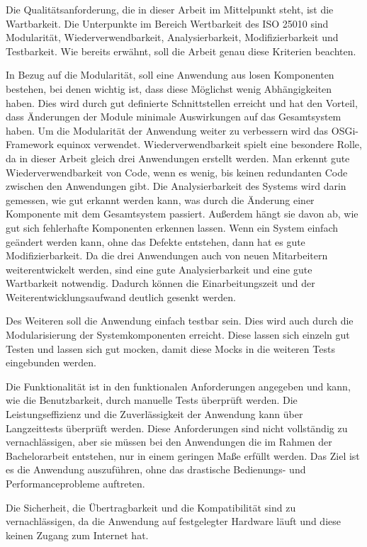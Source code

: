 Die Qualitätsanforderung, die in dieser Arbeit im Mittelpunkt steht, ist die Wartbarkeit. Die Unterpunkte im Bereich Wertbarkeit des ISO 25010 sind Modularität, Wiederverwendbarkeit, Analysierbarkeit, Modifizierbarkeit und Testbarkeit. Wie bereits erwähnt, soll die Arbeit genau diese Kriterien beachten. 

In Bezug auf die Modularität, soll eine Anwendung aus losen Komponenten bestehen, bei denen wichtig ist, dass diese Möglichst wenig Abhängigkeiten haben. Dies wird durch gut definierte Schnittstellen erreicht und hat den Vorteil, dass Änderungen der Module minimale Auswirkungen auf das Gesamtsystem haben. Um die Modularität der Anwendung weiter zu verbessern wird das OSGi-Framework \Gls{equinox} verwendet.
Wiederverwendbarkeit spielt eine besondere Rolle, da in dieser Arbeit gleich drei Anwendungen erstellt werden. Man erkennt gute Wiederverwendbarkeit von Code, wenn es wenig, bis keinen redundanten Code zwischen den Anwendungen gibt. Die Analysierbarkeit des Systems wird darin gemessen, wie gut erkannt werden kann, was durch die Änderung einer Komponente mit dem Gesamtsystem passiert. Außerdem hängt sie davon ab, wie gut sich fehlerhafte Komponenten erkennen lassen. Wenn ein System einfach geändert werden kann, ohne das Defekte entstehen, dann hat es gute Modifizierbarkeit. Da die drei Anwendungen auch von neuen Mitarbeitern weiterentwickelt werden, sind eine gute Analysierbarkeit und eine gute Wartbarkeit notwendig.  Dadurch können die Einarbeitungszeit und der Weiterentwicklungsaufwand deutlich gesenkt werden.

Des Weiteren soll die Anwendung einfach testbar sein. Dies wird auch durch die Modularisierung der Systemkomponenten erreicht. Diese lassen sich einzeln gut Testen und lassen sich gut mocken, damit diese Mocks in die weiteren Tests eingebunden werden.

Die Funktionalität ist in den funktionalen Anforderungen angegeben und kann, wie die Benutzbarkeit, durch manuelle Tests überprüft werden. Die Leistungseffizienz und die Zuverlässigkeit der Anwendung kann über Langzeittests überprüft werden. Diese Anforderungen sind nicht vollständig zu vernachlässigen, aber sie müssen bei den Anwendungen die im Rahmen der Bachelorarbeit entstehen, nur in einem geringen Maße erfüllt werden. Das Ziel ist es die Anwendung auszuführen, ohne das drastische Bedienungs- und Performanceprobleme auftreten.

Die Sicherheit, die Übertragbarkeit und die Kompatibilität sind zu vernachlässigen, da die Anwendung auf festgelegter Hardware läuft und diese keinen Zugang zum Internet hat. 
